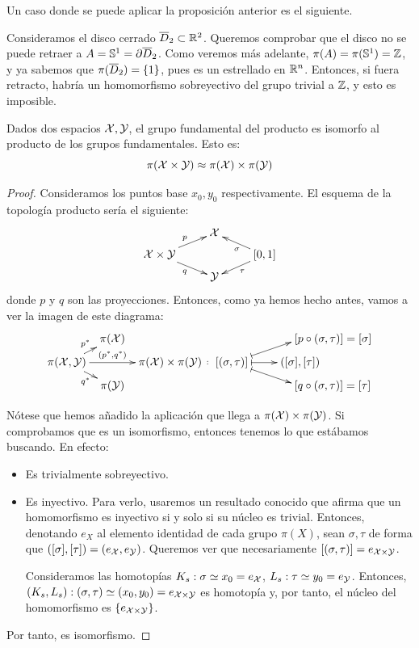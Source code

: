 Un caso donde se puede aplicar la proposición anterior es el siguiente.

\begin{exa}
	Consideramos el disco cerrado $\overline{D}_2\subset\mathbb{R}^2$. Queremos comprobar que el disco no se puede retraer a $A=\mathbb{S}^1=\partial\overline{D}_2$. Como veremos más adelante, $\pi(A)=\pi(\mathbb{S}^1)=\mathbb{Z}$, y ya sabemos que $\pi(\overline{D}_2)=\{1\}$, pues es un estrellado en $\mathbb{R}^n$. Entonces, si fuera retracto, habría un homomorfismo sobreyectivo del grupo trivial a $\mathbb{Z}$, y esto es imposible.
\end{exa}

\begin{prop}
	\label{grf_prop_gf_prod_es_prod_gf}
	Dados dos espacios $\mathcal{X},\mathcal{Y}$, el grupo fundamental del producto es isomorfo al producto de los grupos fundamentales. Esto es:
	\[\pi(\mathcal{X}\times\mathcal{Y})\approx\pi(\mathcal{X})\times\pi(\mathcal{Y})\]
	
	\begin{proof}
		Consideramos los puntos base $x_0,y_0$ respectivamente. El esquema de la topología producto sería el siguiente:
		\[\xymatrix @R = 0.4pc{
			& \X & \\
			\X\times\Y \ar[ur]^p \ar[dr]_q & & [0,1] \ar[ul]^\sigma \ar[dl]^\tau \\
			& \Y &
		}\]
		donde $p$ y $q$ son las proyecciones. Entonces, como ya hemos hecho antes, vamos a ver la imagen de este diagrama:
		\[\xymatrix @R = 0.4pc @C = 0.5pc {
			& \pi(\X) & & & *+[r]{[p\circ (\sigma,\tau)]=[\sigma]} \\
			\pi(\X,\Y)  \ar[ru]^{p^\ast} \ar[rd]_{q^\ast} \ar[rr]^-{(p^\ast,q^\ast)} & & \pi(\X)\times\pi(\Y) \ar@{}[r]|-\colon& [(\sigma,\tau)] \ar@{|->}[ru] \ar@{|->}[rd] \ar@{|->}[r] & ([\sigma],[\tau]) \\
			& \pi(\Y) & & & *+[r]{[q\circ (\sigma,\tau)]=[\tau]}
		}\]
		
		Nótese que hemos añadido la aplicación que llega a $\pi(\mathcal{X})\times\pi(\mathcal{Y})$. Si comprobamos que es un isomorfismo, entonces tenemos lo que estábamos buscando. En efecto:
		\begin{itemize}
			\item Es trivialmente sobreyectivo.
			\item Es inyectivo. Para verlo, usaremos un resultado conocido que afirma que un homomorfismo es inyectivo si y solo si su núcleo es trivial. Entonces, denotando $e_X$ al elemento identidad de cada grupo $\pi(X)$, sean $\sigma,\tau$ de forma que $([\sigma],[\tau])=(e_{\mathcal{X}},e_{\mathcal{Y}})$. Queremos ver que necesariamente $[(\sigma,\tau)]=e_{\mathcal{X}\times \mathcal{Y}}$.
			
			Consideramos las homotopías $K_s:\sigma\mathrel{\smash{\underset{}{\simeq}}} x_0=e_{\mathcal{X}}$, $L_s:\tau\mathrel{\smash{\underset{}{\simeq}}} y_0=e_{\mathcal{Y}}$. Entonces, $(K_s,L_s):(\sigma,\tau)\mathrel{\smash{\underset{}{\simeq}}}(x_0,y_0)=e_{\mathcal{X}\times\mathcal{Y}}$ es homotopía y, por tanto, el núcleo del homomorfismo es $\{e_{\mathcal{X}\times\mathcal{Y}}\}$.
		\end{itemize}
		Por tanto, es isomorfismo.
	\end{proof}
\end{prop}

